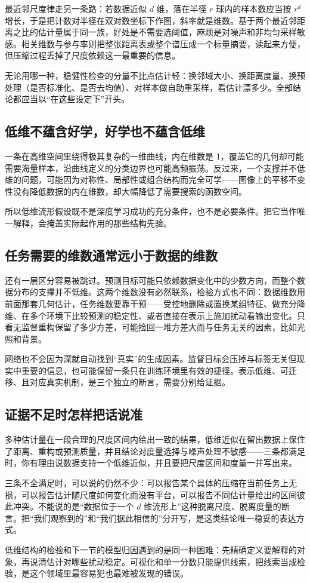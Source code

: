 最近邻尺度律走另一条路：若数据近似 \(d\) 维，落在半径 \(r\) 球内的样本数应当按 \(r^d\) 增长，于是把计数对半径在双对数坐标下作图，斜率就是维数。基于两个最近邻距离之比的估计量属于同一族，好处是不需要选阈值，麻烦是对噪声和非均匀采样敏感。相关维数与参与率则把整张距离表或整个谱压成一个标量摘要，读起来方便，但压缩过程丢掉了尺度依赖这一最重要的信息。

无论用哪一种，稳健性检查的分量不比点估计轻：换邻域大小、换距离度量、换预处理（是否标准化、是否去均值）、对样本做自助重采样，看估计漂多少。全部结论都应当以``在这些设定下''开头。

\subsection{低维不蕴含好学，好学也不蕴含低维}

一条在高维空间里绕得极其复杂的一维曲线，内在维数是 1，覆盖它的几何却可能需要海量样本，沿曲线定义的分类边界也可能高频振荡。反过来，一个支撑并不低维的问题，可能因为对称性、局部性或组合结构而完全可学——图像上的平移不变性没有降低数据的内在维数，却大幅降低了需要搜索的函数空间。

所以低维流形假设既不是深度学习成功的充分条件，也不是必要条件。把它当作唯一解释，会掩盖实际起作用的那些结构先验。

\subsection{任务需要的维数通常远小于数据的维数}

还有一层区分容易被跳过。预测目标可能只依赖数据变化中的少数方向，而整个数据分布的支撑并不低维。这两个维数没有必然联系，检验方式也不同：数据维数用前面那套几何估计，任务维数要靠干预——受控地删除或置换某组特征、做充分降维、在多个环境下比较预测的稳定性、或者直接在表示上施加扰动看输出变化。只看无监督重构保留了多少方差，可能捡回一堆方差大而与任务无关的因素，比如光照和背景。

网络也不会因为深就自动找到``真实''的生成因素。监督目标会压掉与标签无关但现实中重要的信息，也可能保留一条只在训练环境里有效的捷径。表示低维、可迁移、且对应真实机制，是三个独立的断言，需要分别给证据。

\subsection{证据不足时怎样把话说准}

多种估计量在一段合理的尺度区间内给出一致的结果，低维近似在留出数据上保住了距离、重构或预测质量，并且结论对度量选择与噪声处理不敏感——三条都满足时，你有理由说数据支持一个低维近似，并且要把尺度区间和度量一并写出来。

三条不全满足时，可以说的仍然不少：可以报告某个具体的压缩在当前任务上无损，可以报告估计随尺度如何变化而没有平台，可以报告不同估计量给出的区间彼此冲突。不能说的是``数据位于一个 \(d\) 维流形上''这种脱离尺度、脱离度量的断言。把``我们观察到的''和``我们据此相信的''分开写，是这类结论唯一稳妥的表达方式。

低维结构的检验和下一节的模型归因遇到的是同一种困难：先精确定义要解释的对象，再说清估计对哪些扰动稳定。可视化和单一分数只能提供线索，把线索当成检验，是这个领域里最容易犯也最难被发现的错误。

